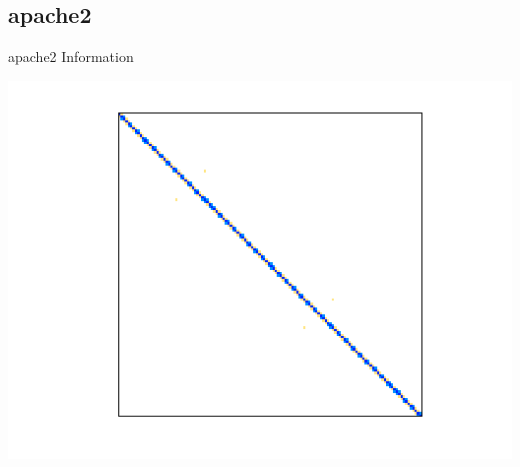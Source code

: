 \subsection{apache2}
\begin{table}[h!]
	\begin{minipage}{0.5\linewidth}
		\caption{apache2 Information}
		\label{table:apache2}
		\centering
        
	\end{minipage}\hfill
	\begin{minipage}{0.45\linewidth}
		\centering
		\includegraphics[width=1\textwidth]{figs/apache2.png}
		\label{fig:apache2}
	\end{minipage}
\end{table}



